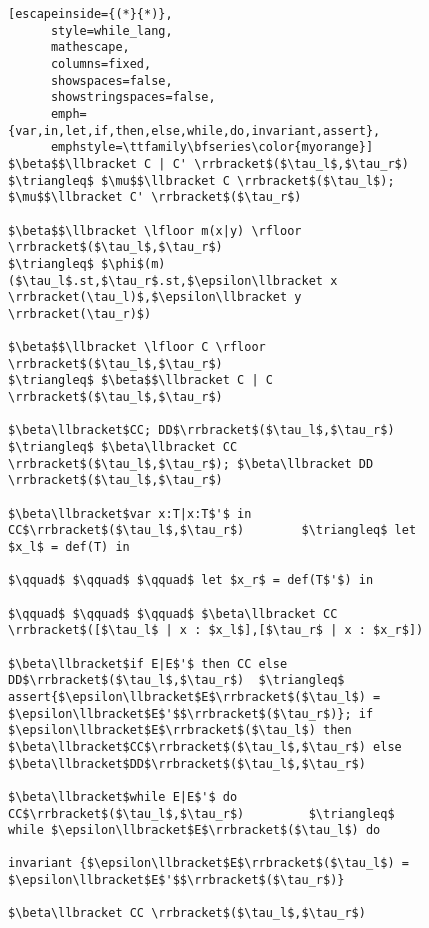 \begin{figure}[ht]
  \centering
  \begin{minipage}{0.99\linewidth}
  \begin{lstlisting}[escapeinside={(*}{*)},
      style=while_lang, 
      mathescape,
      columns=fixed,
      showspaces=false,       
      showstringspaces=false, 
      emph={var,in,let,if,then,else,while,do,invariant,assert},
      emphstyle=\ttfamily\bfseries\color{myorange}]
$\beta$$\llbracket C | C' \rrbracket$($\tau_l$,$\tau_r$)                      $\triangleq$ $\mu$$\llbracket C \rrbracket$($\tau_l$); $\mu$$\llbracket C' \rrbracket$($\tau_r$)

$\beta$$\llbracket \lfloor m(x|y) \rfloor \rrbracket$($\tau_l$,$\tau_r$)                   $\triangleq$ $\phi$(m)($\tau_l$.st,$\tau_r$.st,$\epsilon\llbracket x \rrbracket(\tau_l)$,$\epsilon\llbracket y \rrbracket(\tau_r)$)

$\beta$$\llbracket \lfloor C \rfloor \rrbracket$($\tau_l$,$\tau_r$)                       $\triangleq$ $\beta$$\llbracket C | C \rrbracket$($\tau_l$,$\tau_r$)

$\beta\llbracket$CC; DD$\rrbracket$($\tau_l$,$\tau_r$)                    $\triangleq$ $\beta\llbracket CC \rrbracket$($\tau_l$,$\tau_r$); $\beta\llbracket DD \rrbracket$($\tau_l$,$\tau_r$)

$\beta\llbracket$var x:T|x:T$'$ in CC$\rrbracket$($\tau_l$,$\tau_r$)        $\triangleq$ let $x_l$ = def(T) in 
                                                                        $\qquad$ $\qquad$ $\qquad$ let $x_r$ = def(T$'$) in 
                                                                        $\qquad$ $\qquad$ $\qquad$ $\beta\llbracket CC \rrbracket$([$\tau_l$ | x : $x_l$],[$\tau_r$ | x : $x_r$])

$\beta\llbracket$if E|E$'$ then CC else DD$\rrbracket$($\tau_l$,$\tau_r$)  $\triangleq$ assert{$\epsilon\llbracket$E$\rrbracket$($\tau_l$) = $\epsilon\llbracket$E$'$$\rrbracket$($\tau_r$)}; if $\epsilon\llbracket$E$\rrbracket$($\tau_l$) then $\beta\llbracket$CC$\rrbracket$($\tau_l$,$\tau_r$) else $\beta\llbracket$DD$\rrbracket$($\tau_l$,$\tau_r$)

$\beta\llbracket$while E|E$'$ do CC$\rrbracket$($\tau_l$,$\tau_r$)         $\triangleq$ while $\epsilon\llbracket$E$\rrbracket$($\tau_l$) do 
                                                                                  invariant {$\epsilon\llbracket$E$\rrbracket$($\tau_l$) = $\epsilon\llbracket$E$'$$\rrbracket$($\tau_r$)}
                                                                                  $\beta\llbracket CC \rrbracket$($\tau_l$,$\tau_r$)


\end{lstlisting}
\end{minipage}
\end{figure}
